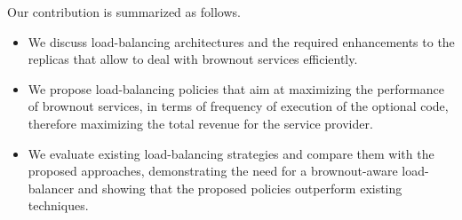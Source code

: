 Our contribution is summarized as follows.
\begin{itemize}
\item We discuss load-balancing architectures and the required
  enhancements to the replicas that allow to deal with brownout
  services efficiently.
\item We propose load-balancing policies that aim at maximizing the
  performance of brownout services, in terms of frequency of execution
  of the optional code, therefore maximizing the total revenue for the
  service provider.
\item We evaluate existing load-balancing strategies and compare them
  with the proposed approaches, demonstrating the need for a
  brownout-aware load-balancer and showing that the proposed policies
  outperform existing techniques.
\end{itemize}
